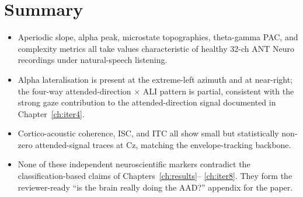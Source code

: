 \section{Summary}

\begin{itemize}
  \item Aperiodic slope, alpha peak, microstate topographies, theta-gamma
        PAC, and complexity metrics all take values characteristic of
        healthy 32-ch ANT Neuro recordings under natural-speech listening.
  \item Alpha lateralisation is present at the extreme-left azimuth
        and at near-right; the four-way attended-direction $\times$ ALI
        pattern is partial, consistent with the strong gaze
        contribution to the attended-direction signal documented in
        Chapter~\ref{ch:iter4}.
  \item Cortico-acoustic coherence, ISC, and ITC all show small but
        statistically non-zero attended-signal traces at Cz, matching
        the envelope-tracking backbone.
  \item None of these independent neuroscientific markers contradict
        the classification-based claims of Chapters~\ref{ch:results}--%
        \ref{ch:iter8}. They form the reviewer-ready ``is the brain
        really doing the AAD?'' appendix for the paper.
\end{itemize}
